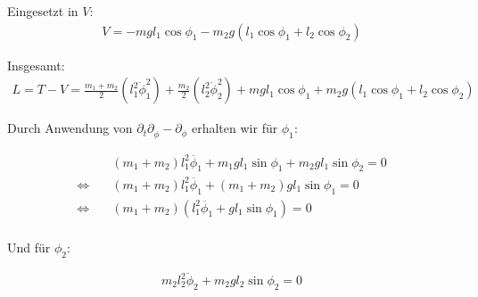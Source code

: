 \documentclass[a4paper,german,12pt,smallheadings]{scrartcl}
\begin{document}
Eingesetzt in $V$:
\begin{align*}
  V = -mgl_1 \cos \phi_1 - m_2g(l_1 \cos \phi_1 + l_2 \cos \phi_2)
\end{align*}

Insgesamt:
\begin{align*}
  L = T - V = \frac{m_1 + m_2}{2} (l_1^2 \dot{\phi}_1^2) + \frac{m_2}{2} (l_2^2 \dot{\phi}_2^2) + mgl_1 \cos \phi_1 + m_2g(l_1 \cos \phi_1 + l_2 \cos \phi_2)
\end{align*}

Durch Anwendung von $\partial_t \partial_{\dot{\phi}} - \partial_\phi$ erhalten wir für $\phi_1$:

\begin{align*}
  &(m_1 + m_2) l_1^2 \ddot{\phi_1} + m_1g l_1 \sin \phi_1 + m_2g l_1 \sin \phi_2 = 0 \\
  \Leftrightarrow\quad& (m_1 + m_2) l_1^2 \ddot{\phi_1} + (m_1 + m_2) gl_1 \sin \phi_1  = 0 \\
  \Leftrightarrow\quad& (m_1 + m_2) (l_1^2 \ddot{\phi_1} + gl_1 \sin \phi_1)  = 0 \\
\end{align*}

Und für $\phi_2$:

\begin{align*}
  m_2 l_2^2 \ddot{\phi}_2 + m_2 g l_2 \sin \phi_2 = 0
\end{align*}
\end{document}

